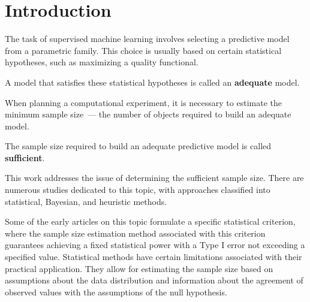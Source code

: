\documentclass[
11pt,%
tightenlines,%
twoside,%
onecolumn,%
nofloats,%
nobibnotes,%
nofootinbib,%
superscriptaddress,%
noshowpacs,%
centertags]%
{revtex4-2}
\begin{document}


\maketitle


\section{Introduction}

The task of supervised machine learning involves selecting a predictive model from a parametric family. This choice is usually based on certain statistical hypotheses, such as maximizing a quality functional.

\begin{definition}
    A model that satisfies these statistical hypotheses is called an \textbf{adequate} model.
\end{definition} 

When planning a computational experiment, it is necessary to estimate the minimum sample size~--- the number of objects required to build an adequate model.

\begin{definition}
    The sample size required to build an adequate predictive model is called \textbf{sufficient}.
\end{definition}

This work addresses the issue of determining the sufficient sample size. There are numerous studies dedicated to this topic, with approaches classified into statistical, Bayesian, and heuristic methods.

Some of the early articles on this topic \cite{Adcock1988, Joseph1995} formulate a specific statistical criterion, where the sample size estimation method associated with this criterion guarantees achieving a fixed statistical power with a Type I error not exceeding a specified value. Statistical methods have certain limitations associated with their practical application. They allow for estimating the sample size based on assumptions about the data distribution and information about the agreement of observed values with the assumptions of the null hypothesis.
\end{document}

